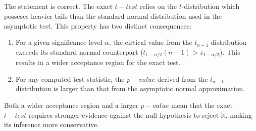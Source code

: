 \subsection{}
The statement is correct. The exact $t-test$ relies on the $t$-distribution which posseses heavier tails than the standard normal distribution used in the asymptotic test. This property has two distinct consequences:
\begin{enumerate}
\item For a given significance level $\alpha$, the cirtical value from the $t_{n-1}$ distribution exceeds its standard normal counterpart ($t_{1-\alpha/2}(n-1) > z_{1-\alpha/2}$). This results in a wider acceptance region for the exact test.
\item For any computed test statistic, the $p-value$ derived from the $t_{n-1}$ distribution is larger than that from the asymptotic normal approximation. 
\end{enumerate}

\noindent Both a wider acceptance region and a larger $p-value$ mean that the exact $t-test$ requires stronger evidence against the null hypothesis to reject it, making its inference more conservative. 